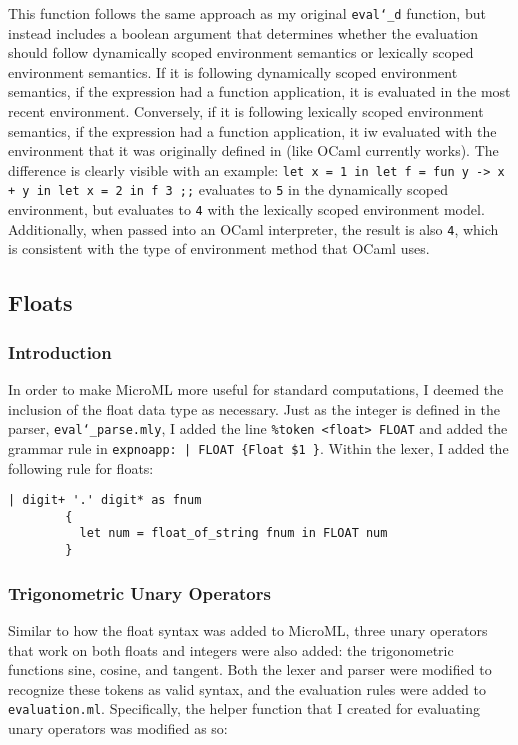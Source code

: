 \documentclass{article}
\begin{document}
This function follows the same approach as my original \texttt{eval\char`_d} function, but instead includes a boolean argument that determines whether the evaluation should follow dynamically scoped environment semantics or lexically scoped environment semantics. If it is following dynamically scoped environment semantics, if the expression had a function application, it is evaluated in the most recent environment. Conversely, if it is following lexically scoped environment semantics, if the expression had a function application, it iw evaluated with the environment that it was originally defined in (like OCaml currently works). The difference is clearly visible with an example: \texttt{let x = 1 in let f = fun y -> x + y in let x = 2 in f 3 ;;} evaluates to \texttt{5} in the dynamically scoped environment, but evaluates to \texttt{4} with the lexically scoped environment model. Additionally, when passed into an OCaml interpreter, the result is also \texttt{4}, which is consistent with the type of environment method that OCaml uses. 

\subsection{Floats}

\subsubsection{Introduction}

In order to make MicroML more useful for standard computations, I deemed the inclusion of the float data type as necessary. Just as the integer is defined in the parser, \texttt{eval\char`_parse.mly}, I added the line \texttt{\%token <float> FLOAT} and added the grammar rule in \texttt{expnoapp: | FLOAT         \{Float \$1 \}}. Within the lexer, I added the following rule for floats: 

\begin{verbatim}
| digit+ '.' digit* as fnum
        {
          let num = float_of_string fnum in FLOAT num
        }
\end{verbatim}

\subsubsection{Trigonometric Unary Operators}

Similar to how the float syntax was added to MicroML, three unary operators that work on both floats and integers were also added: the trigonometric functions sine, cosine, and tangent. Both the lexer and parser were modified to recognize these tokens as valid syntax, and the evaluation rules were added to \texttt{evaluation.ml}. Specifically, the helper function that I created for evaluating unary operators was modified as so:
\end{document}
